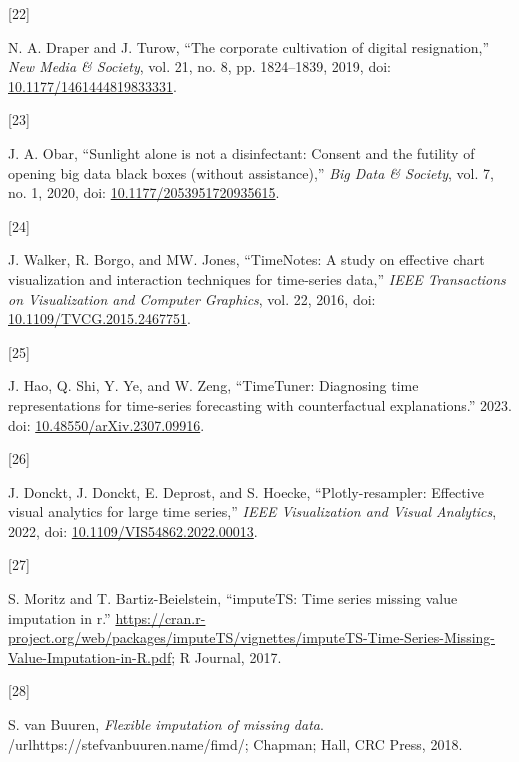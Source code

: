 \documentclass{article}
\newlength{\cslhangindent}
\newlength{\csllabelwidth}
\newlength{\cslentryspacingunit} %
\newenvironment{CSLReferences}[2] %
 {%
  \setlength{\parindent}{0pt}
  \ifodd #1
  \let\oldpar\par
  \def\par{\hangindent=\cslhangindent\oldpar}
  \fi
  \setlength{\parskip}{#2\cslentryspacingunit}
 }%
 {}
\newcommand{\CSLLeftMargin}[1]{\parbox[t]{\csllabelwidth}{#1}}
\newcommand{\CSLRightInline}[1]{\parbox[t]{\linewidth - \csllabelwidth}{#1}\break}
\begin{document}
\begin{CSLReferences}{0}{0}
\leavevmode{}%
\CSLLeftMargin{{[}22{]} }
\CSLRightInline{N. A. Draper and J. Turow, {``The corporate cultivation
of digital resignation,''} \emph{New Media \& Society}, vol. 21, no. 8,
pp. 1824--1839, 2019, doi:
\href{https://doi.org/10.1177/1461444819833331}{10.1177/1461444819833331}.}

\leavevmode{}%
\CSLLeftMargin{{[}23{]} }
\CSLRightInline{J. A. Obar, {``Sunlight alone is not a disinfectant:
Consent and the futility of opening big data black boxes (without
assistance),''} \emph{Big Data \& Society}, vol. 7, no. 1, 2020, doi:
\href{https://doi.org/10.1177/2053951720935615}{10.1177/2053951720935615}.}

\leavevmode{}%
\CSLLeftMargin{{[}24{]} }
\CSLRightInline{J. Walker, R. Borgo, and MW. Jones, {``TimeNotes: A
study on effective chart visualization and interaction techniques for
time-series data,''} \emph{IEEE Transactions on Visualization and
Computer Graphics}, vol. 22, 2016, doi:
\href{https://doi.org/10.1109/TVCG.2015.2467751}{10.1109/TVCG.2015.2467751}.}

\leavevmode{}%
\CSLLeftMargin{{[}25{]} }
\CSLRightInline{J. Hao, Q. Shi, Y. Ye, and W. Zeng, {``TimeTuner:
Diagnosing time representations for time-series forecasting with
counterfactual explanations.''} 2023. doi:
\href{https://doi.org/10.48550/arXiv.2307.09916}{10.48550/arXiv.2307.09916}.}

\leavevmode{}%
\CSLLeftMargin{{[}26{]} }
\CSLRightInline{J. Donckt, J. Donckt, E. Deprost, and S. Hoecke,
{``Plotly-resampler: Effective visual analytics for large time
series,''} \emph{IEEE Visualization and Visual Analytics}, 2022, doi:
\href{https://doi.org/10.1109/VIS54862.2022.00013}{10.1109/VIS54862.2022.00013}.}

\leavevmode{}%
\CSLLeftMargin{{[}27{]} }
\CSLRightInline{S. Moritz and T. Bartiz-Beielstein, {``imputeTS: Time
series missing value imputation in r.''}
\url{https://cran.r-project.org/web/packages/imputeTS/vignettes/imputeTS-Time-Series-Missing-Value-Imputation-in-R.pdf};
R Journal, 2017.}

\leavevmode{}%
\CSLLeftMargin{{[}28{]} }
\CSLRightInline{S. van Buuren, \emph{Flexible imputation of missing
data}. /url{https://stefvanbuuren.name/fimd/}; Chapman; Hall, CRC Press,
2018.}


\end{CSLReferences}
\end{document}
